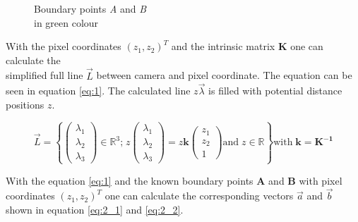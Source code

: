 \begin{figure}[H]
\begin{minipage}[t]{0.5\textwidth}
        \caption{Boundary points \textit{A} and \textit{B} \\in green colour}
        \label{fig:250_green}
     \end{minipage}
\end{figure}

\newpage 
With the pixel coordinates $(z_1, z_2)^{T}$ and the intrinsic matrix $\bm{K}$ one can calculate the \\ simplified full line $\vec{L}$ between camera and pixel coordinate. The equation can be seen in equation \ref{eq:1}. The calculated line $z \vec{\lambda}$ is filled with potential distance positions $z$.

{\large
\begin{equation}\label{eq:1}
    \vec{L} = \left \{ 
            \begin{pmatrix}
                \lambda_1\\ 
                \lambda_2\\ 
                \lambda_3
            \end{pmatrix} 
            \in \mathbb{R}^{3}\text{;}\;
            z \! \begin{pmatrix}
                \lambda_1\\ 
                \lambda_2\\ 
                \lambda_3
            \end{pmatrix} 
            = z\bm{k}
            \begin{pmatrix}
                z_1\\ 
                z_2\\ 
                1
            \end{pmatrix} 
            \text{and} \; z \in \mathbb{R}\right \}
            \text{with} \; \bm{k} = \bm{K^{-1}}
\end{equation}
}
\vspace{2mm}


With the equation \ref{eq:1} and the known boundary points \textbf{A} and \textbf{B} with pixel coordinates $(z_1, z_2)^{T}$ one can calculate the corresponding vectors $\vec{a}$ and $\vec{b}$ shown in equation \ref{eq:2_1} and \ref{eq:2_2}.

